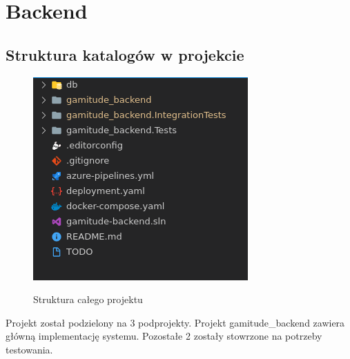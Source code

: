 \documentclass[a4paper,11pt]{report}
\begin{document}
\section{Backend}
\subsection{Struktura katalogów w projekcie}
\begin{figure}[H]
	\centering
	\includegraphics[scale=0.5]{implementacja/backend/struktura_folderow}\\
	\caption{Struktura całego projektu}
	\label{fig:folders}
\end{figure}
Projekt został podzielony na 3 podprojekty. Projekt gamitude\_backend zawiera główną implementację systemu.
Pozostałe 2 zostały stowrzone na potrzeby testowania.
\end{document}
